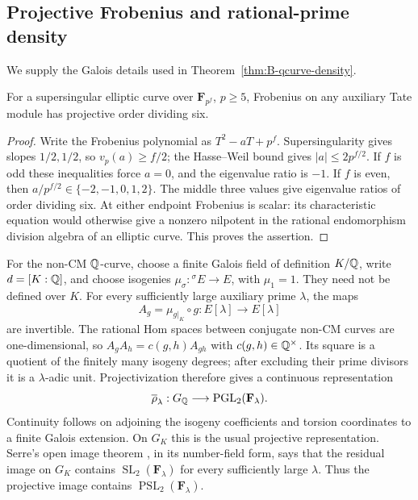 \subsection{Projective Frobenius and rational-prime density}
\label{rev:qcurve-proof}
We supply the Galois details used in
Theorem~\ref{thm:B-qcurve-density}.

\begin{lemma}
\label{lem:B-supersingular-frobenius}
For a supersingular elliptic curve over $\mathbf F_{p^f}$,
$p\ge5$, Frobenius on any auxiliary Tate module has projective
order dividing six.
\end{lemma}
\begin{proof}
Write the Frobenius polynomial as $T^2-aT+p^f$.
Supersingularity gives slopes $1/2,1/2$, so
$v_p(a)\ge f/2$; the Hasse--Weil bound gives
$|a|\le2p^{f/2}$.  If $f$ is odd these inequalities force $a=0$,
and the eigenvalue ratio is $-1$.  If $f$ is even, then
$a/p^{f/2}\in\{-2,-1,0,1,2\}$.  The middle three values give
eigenvalue ratios of order dividing six.  At either endpoint
Frobenius is scalar: its characteristic equation would otherwise
give a nonzero nilpotent in the rational endomorphism division
algebra of an elliptic curve.  This proves the assertion.
\end{proof}

For the non-CM $\mathbb Q$-curve, choose a finite Galois field of
definition $K/\mathbb Q$, write $d=[K:\mathbb Q]$, and choose isogenies
$\mu_\sigma:{}^\sigma E\to E$, with $\mu_1=1$.
They need not be defined over $K$.  For every sufficiently large
auxiliary prime $\lambda$, the maps
\[
 A_g=\mu_{g|_K}\circ g:E[\lambda]\longrightarrow E[\lambda]
\]
are invertible.  The rational Hom spaces between conjugate
non-CM curves are one-dimensional, so
$A_gA_h=c(g,h)A_{gh}$ with $c(g,h)\in\mathbb Q^\times$.
Its square is a quotient of the finitely many isogeny degrees;
after excluding their prime divisors it is a $\lambda$-adic
unit.  Projectivization therefore gives a continuous representation
\[
 \overline\rho_\lambda:G_\mathbb Q\longrightarrow
                          \operatorname{PGL}_2(\mathbf F_\lambda).
\]
Continuity follows on adjoining the isogeny coefficients and
torsion coordinates to a finite Galois extension.  On $G_K$ this
is the usual projective representation.  Serre's open image
theorem \cite{Serre}, in its number-field form, says that the
residual image on $G_K$ contains
$\operatorname{SL}_2(\mathbf F_\lambda)$ for every sufficiently
large $\lambda$.  Thus the projective image contains
$\operatorname{PSL}_2(\mathbf F_\lambda)$.

